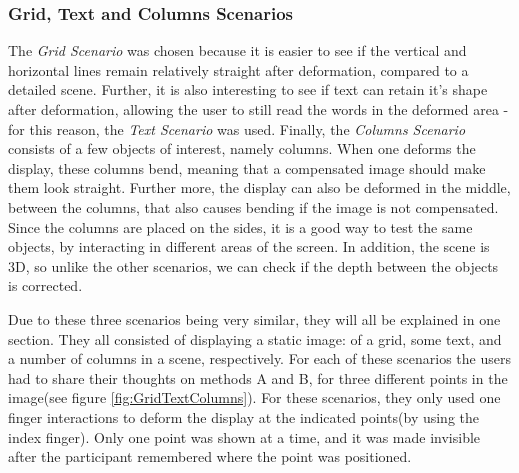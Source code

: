 \documentclass[]{article}
\begin{document}
\subsubsection{Grid, Text and Columns Scenarios}

 The \textit{Grid Scenario} was chosen because it is easier to see if the vertical and horizontal lines remain relatively straight after deformation, compared to a detailed scene. Further, it is also interesting to see if text can retain it's shape after deformation, allowing the user to still read the words in the deformed area - for this reason, the \textit{Text Scenario} was used. Finally, the \textit{Columns Scenario} consists of a few objects of interest, namely columns. When one deforms the display, these columns bend, meaning that a compensated image should make them look straight. Further more, the display can also be deformed in the middle, between the columns, that also causes bending if the image is not compensated. Since the columns are placed on the sides, it is a good way to test the same objects, by interacting in different areas of the screen. In addition, the scene is 3D, so unlike the other scenarios, we can check if the depth between the objects is corrected.

 Due to these three scenarios being very similar, they will all be explained in one section. They all consisted of displaying a static image: of a grid, some text, and a number of columns in a scene, respectively. For each of these scenarios the users had to share their thoughts on methods A and B, for three different points in the image(see figure \ref{fig:GridTextColumns}). For these scenarios, they only used one finger interactions to deform the display at the indicated points(by using the index finger). Only one point was shown at a time, and it was made invisible after the participant remembered where the point was positioned.
\end{document}
